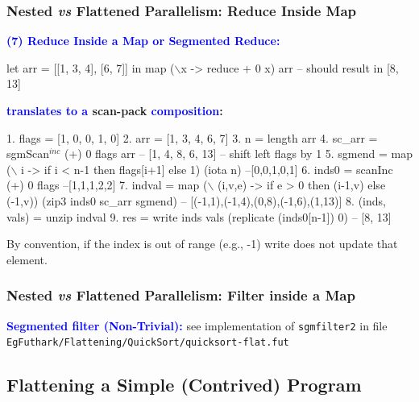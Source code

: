 \documentclass{beamer}
\newcommand{\blue}[1]{\textcolor{Blue}{{#1}}}
\renewcommand{\emph}[1]{\textcolor{structure}{#1}}
\newcommand{\emp}[1]{\textcolor{DikuRed}{ #1}}
\newcommand{\mymath}[1]{$ #1 $}
\newcommand{\myindu}[1]{^{#1}}
\begin{document}
\begin{frame}[fragile,t]
  \frametitle{Nested {\it vs} Flattened Parallelism: Reduce Inside Map}

\blue{\bf (7) Reduce Inside a Map or Segmented Reduce:} 

\begin{colorcode}[fontsize=\scriptsize]
let arr = [[1, 3, 4], [6, 7]] in
map (\mymath{\backslash}x -> reduce + 0 x) arr 
-- should result in [8, 13]
\end{colorcode}

\bigskip
\pause

\textbf{\blue{translates to a} \emp{scan-}\emph{pack} \blue{composition}:}
\bigskip

\begin{colorcode}[fontsize=\scriptsize]
1. flags  = [1, 0, 0, 1, 0]
2. arr    = [1, 3, 4, 6, 7]
3. n      = length arr
4. sc_arr = \emp{sgmScan\mymath{\myindu{inc}}} (+) 0 flags arr -- [1, 4, 8, 6, 13]
-- shift left flags by 1
5. sgmend = map (\mymath{\backslash} i -> if i < n-1 then flags[i+1] else 1) (iota n) --[0,0,1,0,1]
6. inds0  = \emp{scanInc} (+) 0 flags                                      --[1,1,1,2,2]
7. indval = map (\mymath{\backslash} (i,v,e) -> if e > 0 then (i-1,v) else (-1,v))  
                (zip3 inds0 sc_arr sgmend) -- [(-1,1),(-1,4),(0,8),(-1,6),(1,13)]
8. (inds, vals) = unzip indval
9. res    = \emph{write} inds vals (replicate (inds0[n-1]) 0) -- [8, 13]
\end{colorcode}

\alert{By convention, if the index is out of range (e.g., -1) write does not update that element.}

\end{frame}

\begin{frame}[fragile,t]
  \frametitle{Nested {\it vs} Flattened Parallelism: Filter inside a Map}

\blue{\bf Segmented filter (Non-Trivial):} see implementation of {\tt sgmfilter2} in file \\
{\tt EgFuthark/Flattening/QuickSort/quicksort-flat.fut}

\end{frame}


\subsection{Flattening a Simple (Contrived) Program}
\end{document}
